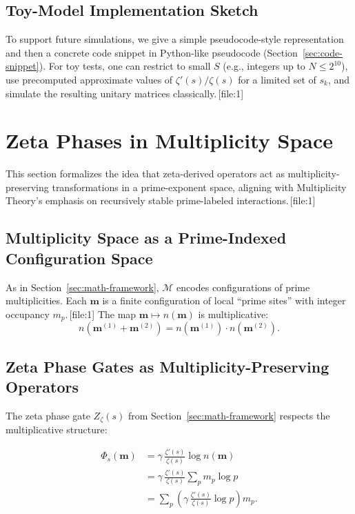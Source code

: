 \documentclass[11pt]{article}
\begin{document}
\subsection{Toy-Model Implementation Sketch}

To support future simulations, we give a simple pseudocode-style representation and then a concrete code snippet in Python-like pseudocode (Section~\ref{sec:code-snippet}). For toy tests, one can restrict to small \(S\) (e.g., integers up to \(N \le 2^{10}\)), use precomputed approximate values of \(\zeta'(s)/\zeta(s)\) for a limited set of \(s_k\), and simulate the resulting unitary matrices classically.\,[file:1]

\section{Zeta Phases in Multiplicity Space}
\label{sec:zeta-multiplicity}

This section formalizes the idea that zeta-derived operators act as multiplicity-preserving transformations in a prime-exponent space, aligning with Multiplicity Theory's emphasis on recursively stable prime-labeled interactions.\,[file:1]

\subsection{Multiplicity Space as a Prime-Indexed Configuration Space}

As in Section~\ref{sec:math-framework}, \(\mathcal{M}\) encodes configurations of prime multiplicities. Each \(\mathbf{m}\) is a finite configuration of local ``prime sites'' with integer occupancy \(m_p\).\,[file:1] The map \(\mathbf{m} \mapsto n(\mathbf{m})\) is multiplicative:
\[
n(\mathbf{m}^{(1)} + \mathbf{m}^{(2)}) = n(\mathbf{m}^{(1)}) \cdot n(\mathbf{m}^{(2)}).
\]

\subsection{Zeta Phase Gates as Multiplicity-Preserving Operators}

The zeta phase gate \(Z_\zeta(s)\) from Section~\ref{sec:math-framework} respects the multiplicative structure:

\begin{align*}
    \Phi_s(\mathbf{m}) &= \gamma\,\frac{\zeta'(s)}{\zeta(s)} \log n(\mathbf{m}) \\
    &= \gamma\,\frac{\zeta'(s)}{\zeta(s)} \sum_p m_p \log p \\
    &= \sum_p \left( \gamma\,\frac{\zeta'(s)}{\zeta(s)} \log p \right) m_p.
\end{align*}
\end{document}
